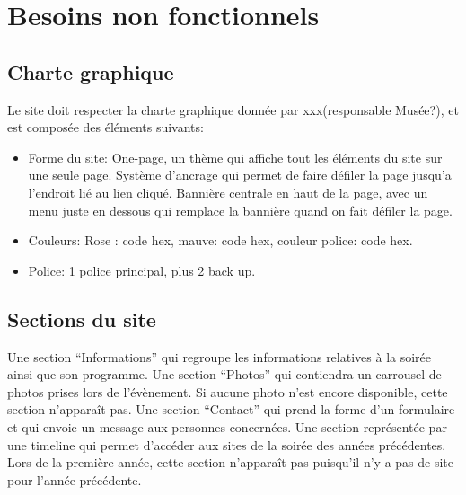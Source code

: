 \documentclass[12pt]{article}
\begin{document}

\section{Besoins non fonctionnels}

\subsection*{Charte graphique}

Le site doit respecter la charte graphique donnée par xxx(responsable Musée?), et est composée des éléments suivants:
\begin{itemize}
  \item Forme du site: One-page, un thème qui affiche tout les éléments du site sur une seule page. Système d'ancrage qui permet de faire défiler la page jusqu'a l'endroit lié au lien cliqué. Bannière centrale en haut de la page, avec un menu juste en dessous qui remplace la bannière quand on fait défiler la page.
  \item Couleurs: Rose : code hex, mauve: code hex, couleur police: code hex.
  \item Police: 1 police principal, plus 2 back up.
\end{itemize}

\subsection*{Sections du site}

 Une section “Informations” qui regroupe les informations relatives à la soirée ainsi que son programme. Une section “Photos” qui contiendra un carrousel de photos prises lors de l’évènement. Si aucune photo n’est encore disponible, cette section n'apparaît pas. Une section “Contact” qui prend la forme d’un formulaire et qui envoie un message aux personnes concernées. Une section représentée par une timeline qui permet d’accéder aux sites de la soirée des années précédentes. Lors de la première année, cette section n'apparaît pas puisqu'il n’y a pas de site pour l’année précédente.

\end{document}
